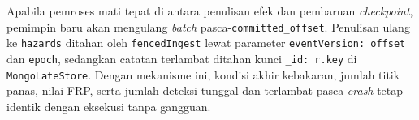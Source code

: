 Apabila pemroses mati tepat di antara penulisan efek dan pembaruan \textit{checkpoint}, pemimpin baru akan mengulang \textit{batch} pasca-\texttt{committed\_offset}. Penulisan ulang ke \texttt{hazards} ditahan oleh \texttt{fencedIngest} lewat parameter \texttt{eventVersion: offset} dan \texttt{epoch}, sedangkan catatan terlambat ditahan kunci \texttt{\_id: r.key} di \texttt{MongoLateStore}. Dengan mekanisme ini, kondisi akhir kebakaran, jumlah titik panas, nilai FRP, serta jumlah deteksi tunggal dan terlambat pasca-\textit{crash} tetap identik dengan eksekusi tanpa gangguan.
